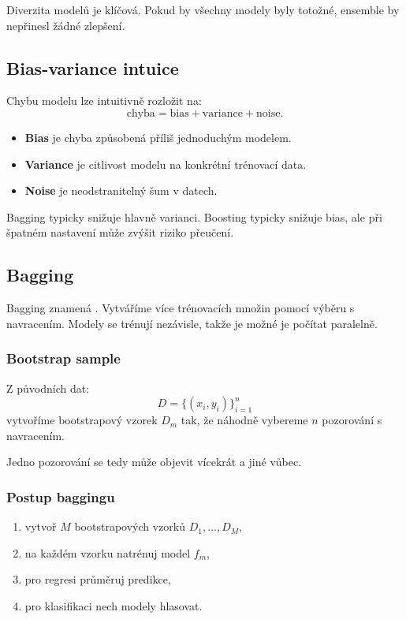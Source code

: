 Diverzita modelů je klíčová. Pokud by všechny modely byly totožné, ensemble by nepřinesl žádné zlepšení.

\subsection{Bias-variance intuice}

Chybu modelu lze intuitivně rozložit na:
\[
\text{chyba}
=
\text{bias}
+
\text{variance}
+
\text{noise}.
\]

\begin{itemize}
    \item \textbf{Bias} je chyba způsobená příliš jednoduchým modelem.
    \item \textbf{Variance} je citlivost modelu na konkrétní trénovací data.
    \item \textbf{Noise} je neodstranitelný šum v datech.
\end{itemize}

Bagging typicky snižuje hlavně varianci. Boosting typicky snižuje bias, ale při špatném nastavení může zvýšit
riziko přeučení.

\subsection{Bagging}

Bagging znamená . Vytváříme více trénovacích množin pomocí výběru s navracením.
Modely se trénují nezávisle, takže je možné je počítat paralelně.

\subsubsection{Bootstrap sample}

Z původních dat:
\[
D=\{(x_i,y_i)\}_{i=1}^n
\]
vytvoříme bootstrapový vzorek $D_m$ tak, že náhodně vybereme $n$ pozorování s navracením.

Jedno pozorování se tedy může objevit vícekrát a jiné vůbec.

\subsubsection{Postup baggingu}

\begin{enumerate}
    \item vytvoř $M$ bootstrapových vzorků $D_1,\ldots,D_M$,
    \item na každém vzorku natrénuj model $f_m$,
    \item pro regresi průměruj predikce,
    \item pro klasifikaci nech modely hlasovat.
\end{enumerate}

